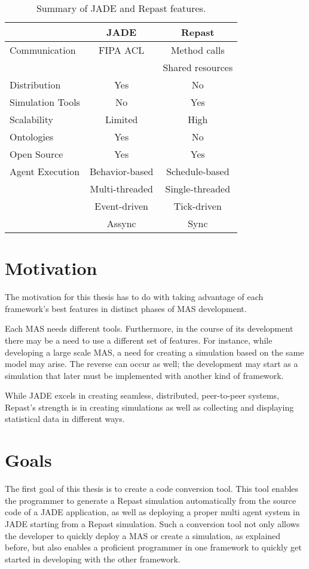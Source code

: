 \begin{table}[tb]
	\caption{Summary of JADE and Repast features.}
	\label{tab:jadevsrep}
	\begin{center}
		\begin{tabular}{l|cc}
		\hline

		\hline
		\textbf{} & \textbf{JADE} & \textbf{Repast} \\
		\hline
			Communication & FIPA ACL &  Method calls \\
						  &			 &  Shared resources \\
		\hline
			Distribution & Yes & No \\
		\hline
			Simulation Tools & No & Yes \\
		\hline
			Scalability & Limited & High \\
		\hline
			Ontologies & Yes & No \\
		\hline
			Open Source & Yes & Yes \\
		\hline
			Agent Execution & Behavior-based & Schedule-based \\
							& Multi-threaded & Single-threaded \\
							& Event-driven   & Tick-driven \\
							& Assync		 & Sync \\
		\hline
		\end{tabular}
	\end{center}
\end{table}

\section{Motivation} \label{sec:goals}
The motivation for this thesis has to do with taking advantage of each
framework's best features in distinct phases of MAS development.

Each MAS needs different tools. Furthermore, in the course of its development
there may be a need to use a different set of features. For instance, while
developing a large scale MAS, a need for creating a simulation based on the
same model may arise. The reverse can occur as well; the development may start
as a simulation that later must be implemented with another kind of framework.

While JADE excels in creating seamless, distributed, peer-to-peer systems,
Repast's strength is in creating simulations as well as collecting and displaying statistical data in different ways.


\section{Goals}
The first goal of this thesis is to create a code conversion tool. This tool enables the programmer to generate a Repast simulation automatically from the source code of a JADE application, as well as deploying a proper multi agent system in JADE starting from a Repast simulation.
Such a conversion tool not only allows the developer to quickly deploy a MAS or create a simulation, as explained before, but also enables a proficient programmer in one framework to quickly get started in developing with the other framework.

